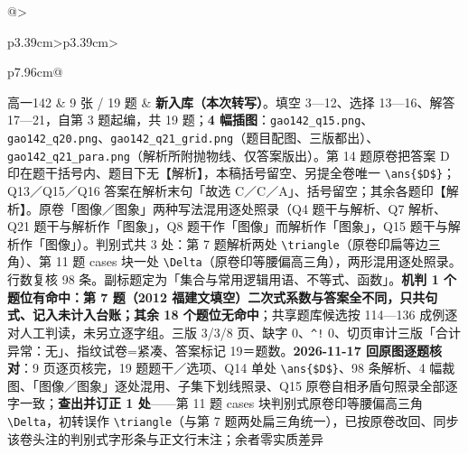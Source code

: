 \documentclass[a4paper,11pt]{article}
\begin{document}
\begin{xltabular}{\textwidth}{@{}>{\raggedright\arraybackslash}p{3.39cm}>{\centering\arraybackslash}p{3.39cm}>{\raggedright\arraybackslash}p{7.96cm}@{}}
高一142 & 9 张 / 19 题 & \textbf{新入库（本次转写）}。填空 3---12、选择 13---16、解答 17---21，自第 3 题起编，共 19 题；\textbf{4 幅插图}：\texttt{gao142\_q15.png}、\texttt{gao142\_q20.png}、\texttt{gao142\_q21\_grid.png}（题目配图、三版都出）、\texttt{gao142\_q21\_para.png}（解析所附抛物线、仅答案版出）。第 14 题原卷把答案 D 印在题干括号内、题目下无【解析】，本稿括号留空、另提全卷唯一 \texttt{\textbackslash{}ans\{\$D\$\}}；Q13／Q15／Q16 答案在解析末句「故选 C／C／A」、括号留空；其余各题印【解析】。原卷「图像／图象」两种写法混用逐处照录（Q4 题干与解析、Q7 解析、Q21 题干与解析作「图象」，Q8 题干作「图像」而解析作「图象」，Q15 题干与解析作「图像」）。判别式共 3 处：第 7 题解析两处 \texttt{\textbackslash{}triangle}（原卷印扁等边三角）、第 11 题 cases 块一处 \texttt{\textbackslash{}Delta}（原卷印等腰偏高三角），两形混用逐处照录。行数复核 98 条。副标题定为「集合与常用逻辑用语、不等式、函数」。\textbf{机判 1 个题位有命中：第 7 题（2012 福建文填空）二次式系数与答案全不同，只共句式、记入未计入台账；其余 18 个题位无命中}；共享题库候选按 114---136 成例逐对人工判读，未另立逐字组。三版 3/3/8 页、缺字 0、\texttt{\^{}!} 0、切页审计三版「合计异常：无」、指纹试卷=紧凑、答案标记 19＝题数。\textbf{2026-11-17 回原图逐题核对}：9 页逐页核完，19 题题干／选项、Q14 单处 \texttt{\textbackslash{}ans\{\$D\$\}}、98 条解析、4 幅裁图、「图像／图象」逐处混用、子集下划线照录、Q15 原卷自相矛盾句照录全部逐字一致；\textbf{查出并订正 1 处}------第 11 题 cases 块判别式原卷印等腰偏高三角 \texttt{\textbackslash{}Delta}，初转误作 \texttt{\textbackslash{}triangle}（与第 7 题两处扁三角统一），已按原卷改回、同步该卷头注的判别式字形条与正文行末注；余者零实质差异 \\ \addlinespace[1pt]

\end{xltabular}
\end{document}
